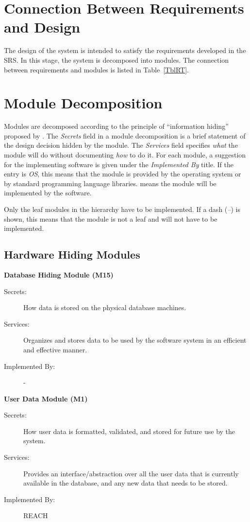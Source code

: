 \documentclass[12pt, titlepage]{article}
\begin{document}
\section{Connection Between Requirements and Design} \label{SecConnection}

The design of the system is intended to satisfy the requirements developed in
the SRS. In this stage, the system is decomposed into modules. The connection
between requirements and modules is listed in Table~\ref{TblRT}.

\section{Module Decomposition} \label{SecMD}

Modules are decomposed according to the principle of ``information hiding''
proposed by \citet{ParnasEtAl1984}. The \emph{Secrets} field in a module
decomposition is a brief statement of the design decision hidden by the
module. The \emph{Services} field specifies \emph{what} the module will do
without documenting \emph{how} to do it. For each module, a suggestion for the
implementing software is given under the \emph{Implemented By} title. If the
entry is \emph{OS}, this means that the module is provided by the operating
system or by standard programming language libraries.  \emph{\progname{}} means the
module will be implemented by the \progname{} software.

Only the leaf modules in the hierarchy have to be implemented. If a dash
(\emph{--}) is shown, this means that the module is not a leaf and will not have
to be implemented.

\subsection{Hardware Hiding Modules}

\textbf{Database Hiding Module (M15)}
\begin{description}
\item[Secrets:] How data is stored on the physical database machines.
\item[Services:] Organizes and stores data to be used by the software system in an efficient and effective manner.
\item[Implemented By:] -\\
\end{description}

\noindent \textbf{User Data Module (M1)}
\begin{description}
  \item[Secrets:] How user data is formatted, validated, and stored for future use by the system.
  \item[Services:] Provides an interface/abstraction over all the user data that is currently available in the database, and any new data that needs to be stored.
  \item[Implemented By:] REACH\\
\end{description}
\end{document}
